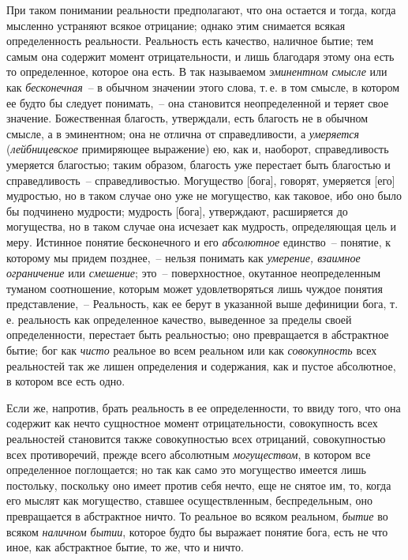При таком понимании реальности предполагают, что
она остается и тогда, когда мысленно устраняют всякое
отрицание; однако этим снимается всякая определенность
реальности. Реальность есть качество, наличное
бытие; тем самым она содержит момент отрицательности,
и лишь благодаря этому она есть то определенное, которое
она есть. В так называемом \emph{эминентном смысле}\endnotemark{}
или как \emph{бесконечная}~-- в обычном значении этого слова,
т.\,е. в том смысле, в котором ее будто бы следует понимать,~--
она становится неопределенной и теряет свое
значение. Божественная благость, утверждали, есть благость
не в обычном смысле, а в эминентном; она не отлична
от справедливости, а \emph{умеряется} (\emph{лейбницевское}
примиряющее выражение) ею, как и, наоборот, справедливость
умеряется благостью; таким образом, благость
уже перестает быть благостью и справедливость~-- справедливостью.
Могущество [бога], говорят, умеряется [его]
мудростью, но в таком случае оно уже не могущество,
как таковое, ибо оно было бы подчинено мудрости; мудрость
[бога], утверждают, расширяется до могущества, но
в таком случае она исчезает как мудрость, определяющая
цель и меру. Истинное понятие бесконечного и его
\emph{абсолютное} единство~-- понятие, к которому мы придем
позднее,~-- нельзя понимать как \emph{умерение, взаимное ограничение}
или \emph{смешение}; это~-- поверхностное, окутанное
неопределенным туманом соотношение, которым может
удовлетворяться лишь чуждое понятия представление,~--
Реальность, как ее берут в указанной выше дефиниции
бога, т.\,е. реальность как определенное качество, выведенное
за пределы своей определенности, перестает быть реальностью;
оно превращается в абстрактное бытие; бог как
\emph{чисто} реальное во всем реальном или как \emph{совокупность}
всех реальностей так же лишен определения и содержания,
как и пустое абсолютное, в котором все есть одно.


Если же, напротив, брать реальность в ее определенности,
то ввиду того, что она содержит как нечто сущностное
момент отрицательности, совокупность всех реальностей
становится также совокупностью всех отрицаний,
совокупностью всех противоречий, прежде всего
абсолютным \emph{могуществом}, в котором все определенное
поглощается; но так как само это могущество имеется
лишь постольку, поскольку оно имеет против себя нечто,
еще не снятое им, то, когда его мыслят как могущество,
ставшее осуществленным, беспредельным, оно превращается
в абстрактное ничто. То реальное во всяком реальном,
\emph{бытие} во всяком \emph{наличном бытии}, которое будто
бы выражает понятие бога, есть не что иное, как абстрактное
бытие, то же, что и ничто.


